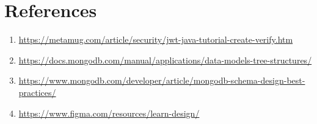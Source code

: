 \documentclass {CSEThesis}
\begin{document}






\tableofcontents 

\listoffigures 


\def\headrulehook{\color{black}}      %

\typeout{}

\clearpage 
\typeout{}

\clearpage 
\typeout{}

\clearpage
\typeout{}

\clearpage
\typeout{}

\clearpage 
\typeout{}

\clearpage 
\typeout{}

\typeout{}
\chapter*{References}
\begin{enumerate}
    \item \label{lbl} \url{https://metamug.com/article/security/jwt-java-tutorial-create-verify.htm}
    \item \url{https://docs.mongodb.com/manual/applications/data-models-tree-structures/}
    \item \url{https://www.mongodb.com/developer/article/mongodb-schema-design-best-practices/}
    \item \url{https://www.figma.com/resources/learn-design/}
\end{enumerate}
\end{document}
